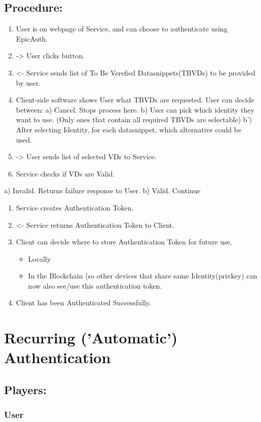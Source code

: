 \documentclass[11pt]{article}
\begin{document}
\subsection{Procedure:}
\label{sec:org5617354}
\begin{enumerate}
\item User is on webpage of Service, and can choose to authenticate using EpicAuth.
\item -> User clicks button.
\item <- Service sends list of To Be Verefied Datasnippets(TBVDs) to be provided by user.
\item Client-side software shows User what TBVDs are requested. User can decide between:
a) Cancel. Stops process here.
b) User can pick which identity they want to use. (Only ones that contain all required TBVDs are selectable)
  b') After selecting Identity, for each datasnippet, which alternative could be used.
\item -> User sends list of selected VDs to Service.
\item Service checks if VDs are Valid.
\end{enumerate}
a) Invalid. Returns failure response to User.
b) Valid. Continue
\begin{enumerate}
\item Service creates Authentication Token.
\item <- Service returns Authentication Token to Client.
\item Client can decide where to store Authentication Token for future use.
\begin{itemize}
\item Locally
\item In the Blockchain (so other devices that share same Identity(privkey) can now also see/use this authentication token.
\end{itemize}
\item Client has been Authenticated Successfully.
\end{enumerate}

\section{Recurring ('Automatic') Authentication}
\label{sec:org52bc33f}
\subsection{Players:}
\label{sec:orgd05d221}
\subsubsection{User}
\label{sec:org0c0f963}
\end{document}
